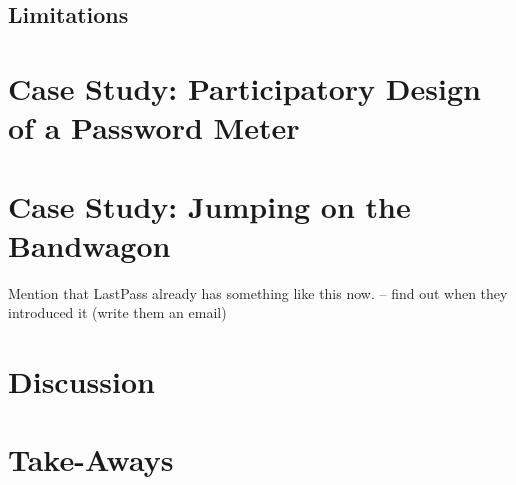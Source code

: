 \subsection{Limitations}


\section{Case Study: Participatory Design of a Password Meter}

\section{Case Study: Jumping on the Bandwagon}
Mention that LastPass already has something like this now. -- find out when they introduced it (write them an email) 

\section{Discussion}



\section{Take-Aways}

